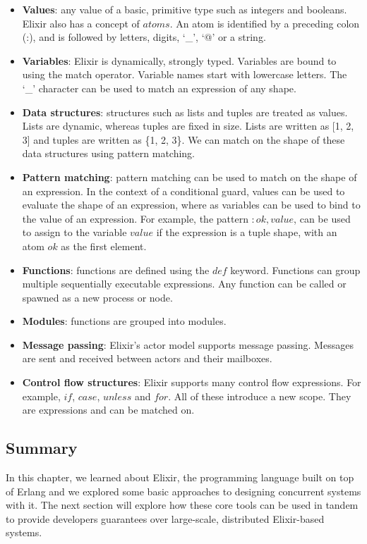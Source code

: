\begin{itemize}
    \item \textbf{Values}: any value of a basic, primitive type such as integers and booleans. Elixir also has a concept of $atoms$. An atom is identified by a preceding colon (:), and is followed by letters, digits, `\_', `@' or a string.
    \item \textbf{Variables}: Elixir is dynamically, strongly typed. Variables are bound to using the match operator. Variable names start with lowercase letters. The `\_' character can be used to match an expression of any shape.
    \item \textbf{Data structures}: structures such as lists and tuples are treated as values. Lists are dynamic, whereas tuples are fixed in size. Lists are written as [1, 2, 3] and tuples are written as \{1, 2, 3\}. We can match on the shape of these data structures using pattern matching.
    \item \textbf{Pattern matching}: pattern matching can be used to match on the shape of an expression. In the context of a conditional guard, values can be used to evaluate the shape of an expression, where as variables can be used to bind to the value of an expression. For example, the pattern ${:ok, value}$, can be used to assign to the variable $value$ if the expression is a tuple shape, with an atom $ok$ as the first element.
    \item \textbf{Functions}: functions are defined using the $def$ keyword. Functions can group multiple sequentially executable expressions. Any function can be called or spawned as a new process or node.
    \item \textbf{Modules}: functions are grouped into modules.
    \item \textbf{Message passing}: Elixir's actor model supports message passing. Messages are sent and received between actors and their mailboxes.
    \item \textbf{Control flow structures}: Elixir supports many control flow expressions. For example, $if$, $case$, $unless$ and $for$. All of these introduce a new scope. They are expressions and can be matched on.
\end{itemize}
\subsection{Summary}
In this chapter, we learned about Elixir, the programming language built on top of Erlang and we explored some basic approaches to designing concurrent systems with it. The next    section will explore how these core tools can be used in tandem to provide developers guarantees over large-scale, distributed Elixir-based systems.